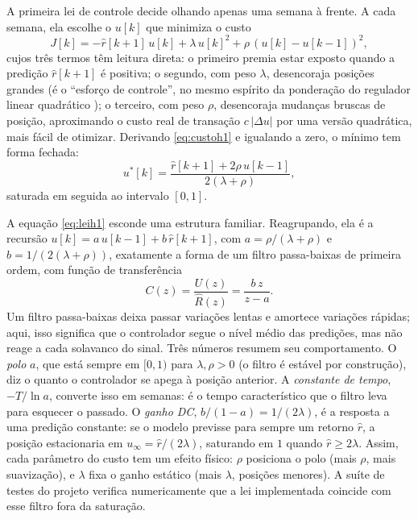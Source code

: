 \documentclass[conference]{IEEEtran}
\begin{document}
A primeira lei de controle decide olhando apenas uma semana à frente. A cada semana, ela escolhe o $u[k]$ que minimiza o custo
\begin{equation}
J[k] = -\hat{r}[k+1]\,u[k] + \lambda\,u[k]^2 + \rho\,(u[k]-u[k-1])^2,
\label{eq:custoh1}
\end{equation}
cujos três termos têm leitura direta: o primeiro premia estar exposto quando a predição $\hat{r}[k+1]$ é positiva; o segundo, com peso $\lambda$, desencoraja posições grandes (é o ``esforço de controle'', no mesmo espírito da ponderação do regulador linear quadrático \cite{anderson1990}); o terceiro, com peso $\rho$, desencoraja mudanças bruscas de posição, aproximando o custo real de transação $c\,|\Delta u|$ por uma versão quadrática, mais fácil de otimizar. Derivando \eqref{eq:custoh1} e igualando a zero, o mínimo tem forma fechada:
\begin{equation}
u^{*}[k] = \frac{\hat{r}[k+1]+2\rho\,u[k-1]}{2(\lambda+\rho)},
\label{eq:leih1}
\end{equation}
saturada em seguida ao intervalo $[0,1]$.

A equação \eqref{eq:leih1} esconde uma estrutura familiar. Reagrupando, ela é a recursão $u[k] = a\,u[k-1] + b\,\hat{r}[k+1]$, com $a = \rho/(\lambda+\rho)$ e $b = 1/(2(\lambda+\rho))$, exatamente a forma de um filtro passa-baixas de primeira ordem, com função de transferência
\begin{equation}
C(z) = \frac{U(z)}{\hat{R}(z)} = \frac{b\,z}{z-a}.
\label{eq:cz}
\end{equation}
Um filtro passa-baixas deixa passar variações lentas e amortece variações rápidas; aqui, isso significa que o controlador segue o nível médio das predições, mas não reage a cada solavanco do sinal. Três números resumem seu comportamento. O \emph{polo} $a$, que está sempre em $[0,1)$ para $\lambda,\rho>0$ (o filtro é estável por construção), diz o quanto o controlador se apega à posição anterior. A \emph{constante de tempo}, $-T/\ln a$, converte isso em semanas: é o tempo característico que o filtro leva para esquecer o passado. O \emph{ganho DC}, $b/(1-a) = 1/(2\lambda)$, é a resposta a uma predição constante: se o modelo previsse para sempre um retorno $\hat{r}$, a posição estacionaria em $u_{\infty} = \hat{r}/(2\lambda)$, saturando em $1$ quando $\hat{r} \ge 2\lambda$. Assim, cada parâmetro do custo tem um efeito físico: $\rho$ posiciona o polo (mais $\rho$, mais suavização), e $\lambda$ fixa o ganho estático (mais $\lambda$, posições menores). A suíte de testes do projeto verifica numericamente que a lei implementada coincide com esse filtro fora da saturação.
\end{document}
